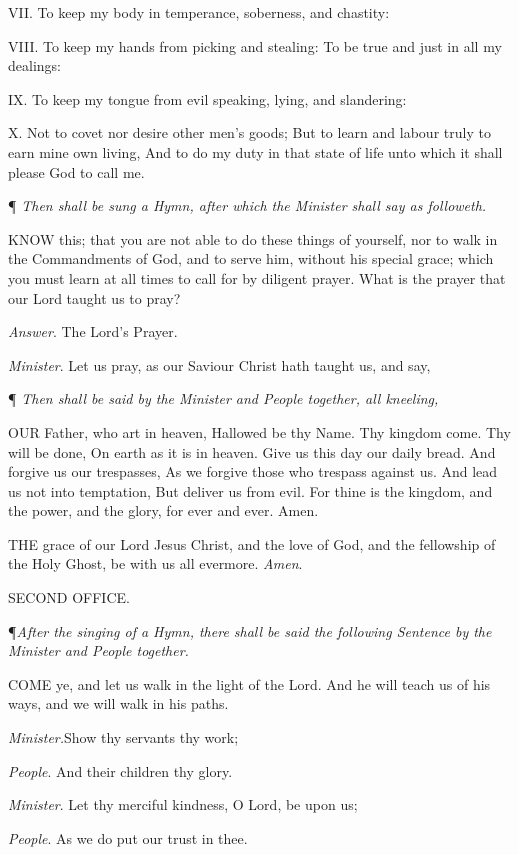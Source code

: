 VII. To keep my body in temperance, soberness, and
chastity:

VIII. To keep my hands from picking and stealing: To
be true and just in all my dealings:

IX. To keep my tongue from evil speaking, lying, and
slandering:

X. Not to covet nor desire other men's goods; But to
learn and labour truly to earn mine own living, And to do my duty in that
state of life unto which it shall please God to call me.

¶
\emph{Then shall be sung a Hymn, after which the Minister shall say as followeth.}

KNOW
this; that you are not able to do these things of yourself, nor to walk
in the Commandments of God, and to serve him, without his special grace;
which you must learn at all times to call for by diligent prayer. What
is the prayer that our Lord taught us to pray?

\emph{Answer}. The Lord's Prayer.

\emph{Minister}. Let us pray, as our Saviour Christ
hath taught us, and say,

¶
\emph{Then shall be said by the Minister and People together, all kneeling,}

OUR
Father, who art in heaven, Hallowed be thy Name. Thy kingdom come. Thy
will be done, On earth as it is in heaven. Give us this day our daily
bread. And forgive us our trespasses, As we forgive those who trespass
against us. And lead us not into temptation, But deliver us from evil.
For thine is the kingdom, and the power, and the glory, for ever and ever.
Amen.

THE
grace of our Lord Jesus Christ, and the love of God, and the fellowship
of the Holy Ghost, be with us all evermore. \emph{Amen}.

SECOND
OFFICE.

¶\emph{After the singing of a Hymn, there shall be said the following Sentence
by the Minister and People together.}

COME
ye, and let us walk in the light of the Lord. And he will teach us of
his ways, and we will walk in his paths.

\emph{Minister.}Show thy servants thy work; 

\emph{People}. And their children thy glory. 

\emph{Minister}. Let thy merciful kindness, O Lord,
be upon us; 

\emph{People}. As we do put our trust in thee. 


